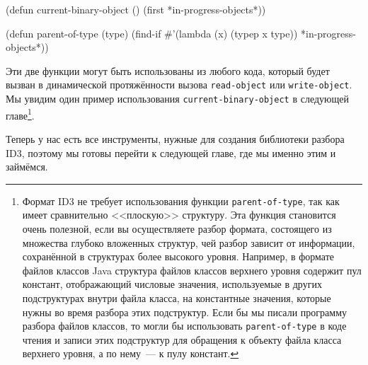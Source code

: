 \begin{myverb}
(defun current-binary-object () (first *in-progress-objects*))

(defun parent-of-type (type)
  (find-if #'(lambda (x) (typep x type)) *in-progress-objects*))
\end{myverb}

Эти две функции могут быть использованы из любого кода, который будет вызван в
динамической протяжённости вызова \lstinline{read-object} или \lstinline{write-object}. Мы увидим
один пример использования \lstinline{current-binary-object} в следующей главе\footnote{Формат
  ID3 не требует использования функции \lstinline{parent-of-type}, так как имеет сравнительно
  <<плоскую>> структуру. Эта функция становится очень полезной, если вы осуществляете
  разбор формата, состоящего из множества глубоко вложенных структур, чей разбор зависит от
  информации, сохранённой в структурах более высокого уровня. Например, в формате файлов
  классов Java структура файлов классов верхнего уровня содержит пул констант,
  отображающий числовые значения, используемые в других подструктурах внутри файла класса,
  на константные значения, которые нужны во время разбора этих подструктур. Если бы мы писали
  программу разбора файлов классов, то могли бы использовать \lstinline{parent-of-type} в коде
  чтения и записи этих подструктур для обращения к объекту файла класса верхнего уровня, а
  по нему~--- к пулу констант.}.

Теперь у нас есть все инструменты, нужные для создания библиотеки разбора ID3, поэтому мы
готовы перейти к следующей главе, где мы именно этим и займёмся.

